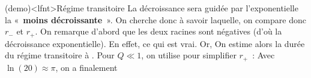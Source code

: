 \documentclass[../../main/main.tex]{subfiles}
\begin{document}
\begin{tcb}[label=demo:transiaper](demo)<lfnt>{Régime transitoire}
	La décroissance sera guidée par l'exponentielle la «~\textbf{moins
		décroissante}~». On cherche donc à savoir laquelle, on compare donc $r_-$ et
	$r_+$.
	\smallbreak
	On remarque d'abord que les deux racines sont négatives (d'où la
	décroissance exponentielle). En effet,
	\vspace{-15pt}
	\vspace{-15pt}
	ce qui est vrai. Or,
	On estime alors la durée du régime transitoire à
	.
	\bigbreak
	Pour $Q \ll 1$, on utilise  pour simplifier $r_+$~:
	Avec $\ln(20) \approx \pi$, on a finalement
	\vspace{-15pt}
\end{tcb}
\end{document}
